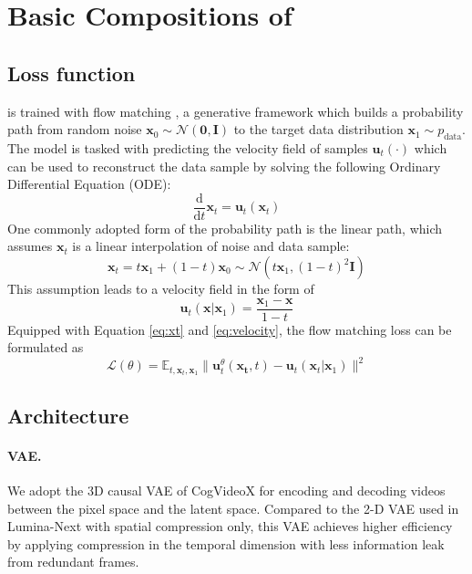 \section{Basic Compositions of~\sysname{}}
\label{sec:basic_comp}
\subsection{Loss function}
\sysname{} is trained with flow matching \cite{FlowMatching,FlowMatchingGuide,RectifiedFlow}, a generative framework which builds a probability path from random noise $\mathbf{x}_0 \sim \mathcal{N}(\mathbf{0}, \mathbf{I})$ to the target data distribution $\mathbf{x}_1 \sim p_{\mathrm{data}}$. 
The model is tasked with predicting the velocity field of samples $\mathbf{u}_t(\cdot)$ which can be used to reconstruct the data sample by solving the following Ordinary Differential Equation (ODE):
\begin{equation}
    \frac{\mathrm{d}}{\mathrm{d}t} \mathbf{x}_t = \mathbf{u}_t (\mathbf{x}_t)
\end{equation}
One commonly adopted form of the probability path is the linear path, which assumes $\mathbf{x}_t$ is a linear interpolation of noise and data sample:
\begin{equation}
\label{eq:xt}
    \mathbf{x}_t = t \mathbf{x}_1 + (1-t) \mathbf{x}_0 \sim \mathcal{N}(t \mathbf{x}_1, (1-t)^2 \mathbf{I})
\end{equation}
This assumption leads to a velocity field in the form of
\begin{equation}
\label{eq:velocity}
    \mathbf{u}_t(\mathbf{x}|\mathbf{x}_1) = \frac{\mathbf{x}_1 - \mathbf{x}}{1 - t}
\end{equation}
Equipped with Equation \ref{eq:xt} and \ref{eq:velocity}, the flow matching loss can be formulated as
\begin{equation}
    \mathcal{L}(\theta) = \mathbb{E}_{t,\mathbf{x}_t,\mathbf{x}_1} \lVert \mathbf{u}^\theta_t(\mathbf{x_t},t) - \mathbf{u}_t(\mathbf{x}_t|\mathbf{x}_1) \rVert^2
\end{equation}

\subsection{Architecture}

\paragraph{VAE.} We adopt the 3D causal VAE of CogVideoX \cite{CogVideoX} for encoding and decoding videos between the pixel space and the latent space. Compared to the 2-D VAE used in Lumina-Next with spatial compression only, this VAE achieves higher efficiency by applying compression in the temporal dimension with less information leak from redundant frames. 

